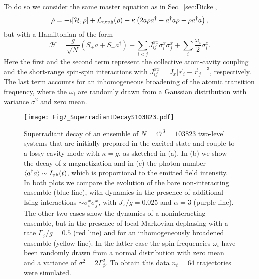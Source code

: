 \documentclass[pra,twocolumn,showpacs,preprintnumbers,amsmath,amssymb,superscriptaddress]{revtex4-1}
\newcommand{\abs}[1]{\lvert#1\rvert}
\newcommand{\sx}{\sigma^{x}}
\begin{document}
 To do so we consider the same master equation as in Sec.~\ref{sec:Dicke},
\begin{equation}\label{eq:MELarge}
\begin{split}
\dot{\rho}=-i [\mathcal{H},\rho]+ \mathcal{L}_{\rm deph}(\rho) + \kappa \left(2a\rho a^\dag - a^\dag a \rho - \rho a^\dag a\right),
\end{split}
\end{equation}
but with a Hamiltonian of the form 
\begin{equation}\label{eqHLarge}
\mathcal{H}= \frac{g}{\sqrt{N}}\left ( S_+ a + S_- a^\dagger \right)  +\sum_{i<j} J^{xx}_{ij}  \sx_i \sx_j + \sum_i \frac{\omega_i}{2} \sigma_i^z.
\end{equation}
Here the first and the second term represent the collective atom-cavity coupling and the short-range spin-spin interactions with $J^{xx}_{ij}=J_x\abs{\vec r_i-\vec r_j}^{-3}$, respectively. The last term accounts for an inhomogeneous broadening of the atomic transition frequency, where the $\omega_i$ are randomly drawn from a Gaussian distribution with variance $\sigma^2$ and zero mean. 

\begin{figure}[t]
	\centering
	\texttt{[image: Fig7\_SuperradiantDecayS103823.pdf]}
	\caption{Superradiant decay of an ensemble of $N=47^3=103823$ two-level systems that are initially prepared in the excited state and couple to a lossy cavity mode with $\kappa=g$, as sketched in (a). In (b) we show the decay of z-magnetization and in (c) the photon number $\langle a^\dag a\rangle \sim I_{\rm ph}(t)$, which is proportional to the emitted field intensity. In both plots we compare the evolution of the bare non-interacting ensemble (blue line), with dynamics in the presence of additional Ising interactions $\sim \sigma_i^x\sigma^x_j$, with $J_x/g=0.025$ and $\alpha=3$ (purple line). The other two cases show the dynamics of a noninteracting ensemble, but in the presence of local Markovian dephasing with a rate $\Gamma_{\phi}/g=0.5$ (red line) and for an inhomogeneously broadened ensemble (yellow line).  In the latter case the spin frequencies $\omega_i$ have been randomly drawn from a normal distribution with zero mean and a variance of $\sigma^2=2\Gamma_\phi^2$. To obtain this data $n_t=64$ trajectories were simulated.}
	\label{fig:SuperradiantDecay}
\end{figure}

\end{document}
